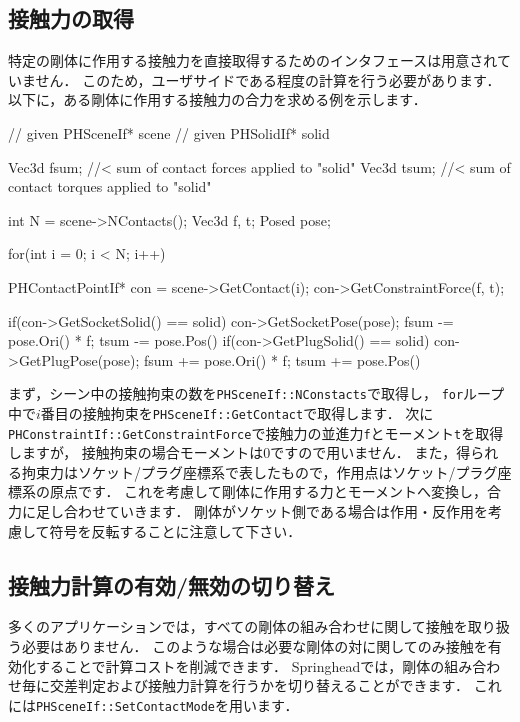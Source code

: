 \subsection*{接触力の取得}

\KLUDGE 特定の剛体に作用する接触力を直接取得するためのインタフェースは用意されていません．
\KLUDGE このため，ユーザサイドである程度の計算を行う必要があります．
\KLUDGE 以下に，ある剛体に作用する接触力の合力を求める例を示します．

\begin{sourcecode}
// given PHSceneIf* scene
// given PHSolidIf* solid

Vec3d fsum;    //< sum of contact forces applied to "solid"
Vec3d tsum;    //< sum of contact torques applied to "solid"

int N = scene->NContacts();
Vec3d f, t;
Posed pose;

for(int i = 0; i < N; i++){
    PHContactPointIf* con = scene->GetContact(i);
    con->GetConstraintForce(f, t);

    if(con->GetSocketSolid() == solid){
        con->GetSocketPose(pose);
        fsum -= pose.Ori() * f;
        tsum -= pose.Pos() %
    }
    if(con->GetPlugSolid() == solid){
        con->GetPlugPose(pose);
        fsum += pose.Ori() * f;
        tsum += pose.Pos() %
    }
}
\end{sourcecode}
\KLUDGE まず，シーン中の接触拘束の数を\texttt{PHSceneIf::NConstacts}で取得し，
\texttt{for}ループ中で$i$番目の接触拘束を\texttt{PHSceneIf::GetContact}で取得します．
\KLUDGE 次に\texttt{PHConstraintIf::GetConstraintForce}で接触力の並進力\texttt{f}とモーメント\texttt{t}を取得しますが，
\KLUDGE 接触拘束の場合モーメントは$0$ですので用いません．
\KLUDGE また，得られる拘束力はソケット/プラグ座標系で表したもので，作用点はソケット/プラグ座標系の原点です．
\KLUDGE これを考慮して剛体に作用する力とモーメントへ変換し，合力に足し合わせていきます．
\KLUDGE 剛体がソケット側である場合は作用・反作用を考慮して符号を反転することに注意して下さい．


\subsection*{接触力計算の有効/無効の切り替え}

\KLUDGE 多くのアプリケーションでは，すべての剛体の組み合わせに関して接触を取り扱う必要はありません．
\KLUDGE このような場合は必要な剛体の対に関してのみ接触を有効化することで計算コストを削減できます．
Springheadでは，剛体の組み合わせ毎に交差判定および接触力計算を行うかを切り替えることができます．
\KLUDGE これには\texttt{PHSceneIf::SetContactMode}を用います．


